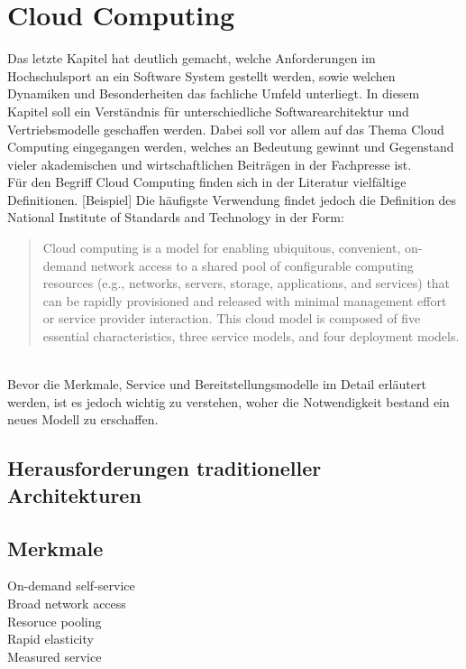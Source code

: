\chapter{Cloud Computing} 
\label{ch:cloud}
Das letzte Kapitel hat deutlich gemacht, welche Anforderungen im Hochschulsport an ein Software System gestellt werden, sowie welchen Dynamiken und Besonderheiten das fachliche Umfeld unterliegt. In diesem Kapitel soll ein Verständnis für unterschiedliche Softwarearchitektur und Vertriebsmodelle geschaffen werden. Dabei soll vor allem auf das Thema Cloud Computing eingegangen werden, welches an Bedeutung gewinnt und Gegenstand vieler akademischen und wirtschaftlichen Beiträgen in der Fachpresse ist. 
\\

Für den Begriff Cloud Computing finden sich in der Literatur vielfältige Definitionen. [Beispiel] Die häufigste Verwendung findet jedoch die Definition des National Institute of Standards and Technology in der Form:

\begin{quote}
	Cloud computing is a model for enabling ubiquitous, convenient, on-demand network access to a shared pool of configurable computing resources (e.g., networks, servers, storage, applications, and services) that can be rapidly provisioned and released with minimal management effort or service provider interaction. This cloud model is composed of five essential characteristics, three service models, and four deployment models.
\end{quote} \cite*[vgl.][S.2]{Mell.2011}\\


Bevor die Merkmale, Service  und Bereitstellungsmodelle im Detail erläutert werden, ist es jedoch wichtig zu verstehen, woher die Notwendigkeit bestand ein neues Modell zu erschaffen.

\section{Herausforderungen traditioneller Architekturen}


\section{Merkmale}
On-demand self-service\\
Broad network access\\
Resoruce pooling\\
Rapid elasticity\\
Measured service
\cite*[vgl.][S.2]{Mell.2011}

